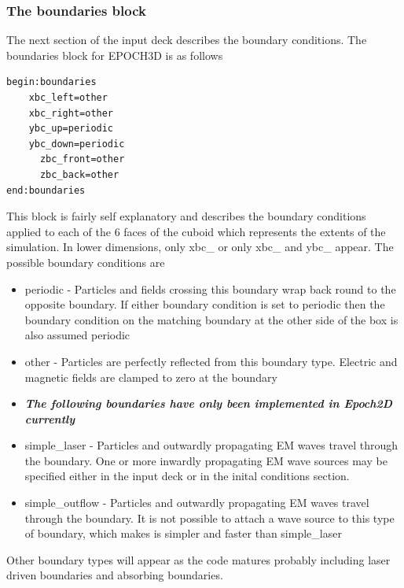 \documentclass[12pt]{article}
\begin{document}
\subsubsection{The boundaries block}
The next section of the input deck describes the boundary conditions. The boundaries block for EPOCH3D is as follows\\
\begin{verbatim}
begin:boundaries
	xbc_left=other
	xbc_right=other
	ybc_up=periodic
	ybc_down=periodic
      zbc_front=other
      zbc_back=other
end:boundaries
\end{verbatim}
This block is fairly self explanatory and describes the boundary conditions applied to each of the 6 faces of the cuboid which represents the extents of the simulation. In lower dimensions, only xbc\_ or only xbc\_ and ybc\_ appear. The possible boundary conditions are\\
\begin{itemize}
\item periodic - Particles and fields crossing this boundary wrap back round to the opposite boundary. If either boundary condition is set to periodic then the boundary condition on the matching boundary at the other side of the box is also assumed periodic
\item other - Particles are perfectly reflected from this boundary type. Electric and magnetic fields are clamped to zero at the boundary
\item {\it \bf The following boundaries have only been implemented in Epoch2D currently}
\item simple\_laser - Particles and outwardly propagating EM waves travel through the boundary. One or more inwardly propagating EM wave sources may be specified either in the input deck or in the inital conditions section.
\item simple\_outflow - Particles and outwardly propagating EM waves travel through the boundary. It is not possible to attach a wave source to this type of boundary, which makes is simpler and faster than simple\_laser
\end{itemize}
Other boundary types will appear as the code matures probably including laser driven boundaries and absorbing boundaries.\\
\end{document}
